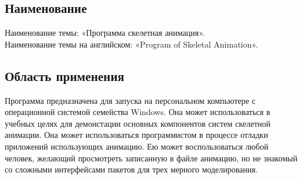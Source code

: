 \subsection{Наименование}
Наименование темы: «Программа скелетная анимация». \\
Наименование темы на английском: «Program of Skeletal Animation». \\

\subsection{Область применения}
Программа предназначена для запуска на персональном компьютере с операционной системой семейства Windows. Она может использоваться в учебных целях для демонстации основных компонентов систем скелетной анимации. Она может использоваться программистом в процессе отладки приложений использующих анимацию. Ею может воспользоваться любой человек, желающий просмотреть записанную в файле анимацию, но не знакомый со сложными интерфейсами пакетов для трех мерного моделирования.
